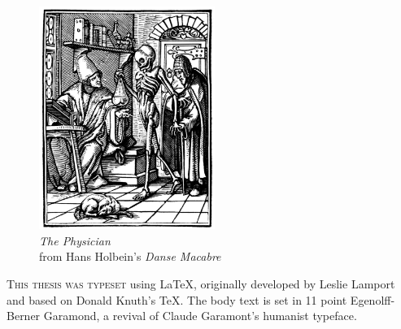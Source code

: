 \newpage

\begin{figure}
    \vspace{50pt}
    \centering
    \includegraphics[width=0.51\textwidth]{assets/holbein-physician.jpg}
    \\
    \emph{The Physician}
    \\
    from Hans Holbein's \emph{Danse Macabre}
\end{figure}


\begin{center}
\parbox{200pt}{\lettrine[lines=3,slope=-2pt,nindent=-4pt]{\textcolor{SchoolColor}{T}}{his
thesis was typeset} using \LaTeX, originally developed by Leslie Lamport and
based on Donald Knuth's \TeX. The body text is set in 11 point Egenolff-Berner
Garamond, a revival of Claude Garamont's humanist typeface. }
\end{center}